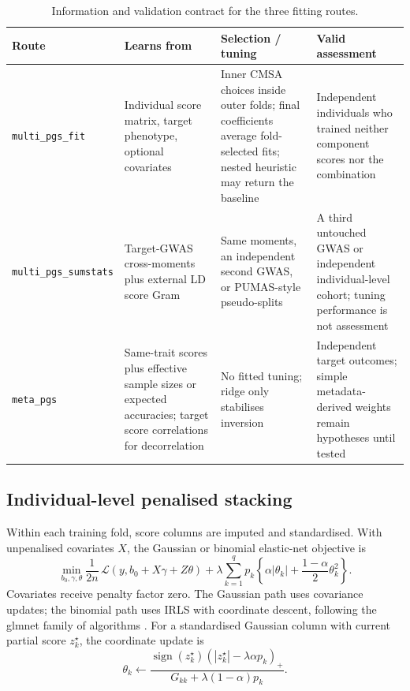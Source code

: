 \documentclass[10pt,a4paper]{article}
\newcommand{\code}[1]{\texttt{#1}}
\begin{document}
\begin{table}[H]
\centering
\caption{Information and validation contract for the three fitting routes.}
\label{tab:method-contract}
\scriptsize
\begin{tabularx}{\linewidth}{@{}L{26mm}Y Y Y@{}}
\toprule
\textbf{Route} & \textbf{Learns from} & \textbf{Selection / tuning} &
\textbf{Valid assessment} \\
\midrule
\code{multi\_pgs\_fit} & Individual score matrix, target phenotype, optional
covariates & Inner CMSA choices inside outer folds; final coefficients average
fold-selected fits; nested heuristic may return the baseline &
Independent individuals who trained neither component scores nor the
combination \\
\code{multi\_pgs\_sumstats} & Target-GWAS cross-moments plus external LD
score Gram & Same moments, an independent second GWAS, or PUMAS-style
pseudo-splits & A third untouched GWAS or independent individual-level cohort;
tuning performance is not assessment \\
\code{meta\_pgs} & Same-trait scores plus effective sample sizes or expected
accuracies; target score correlations for decorrelation & No fitted tuning;
ridge only stabilises inversion & Independent target outcomes; simple
metadata-derived weights remain hypotheses until tested \\
\bottomrule
\end{tabularx}
\end{table}

\subsection{Individual-level penalised stacking}

Within each training fold, score columns are imputed and standardised. With
unpenalised covariates \(X\), the Gaussian or binomial elastic-net objective is
\begin{equation}
  \min_{b_0,\gamma,\theta}
  \frac{1}{2n}\,
  \mathcal L\!\left(y,b_0+X\gamma+Z\theta\right)
  +\lambda\sum_{k=1}^{q}p_k
  \left\{\alpha|\theta_k|
  +\frac{1-\alpha}{2}\theta_k^2\right\}.
  \label{eq:individual-objective}
\end{equation}
Covariates receive penalty factor zero. The Gaussian path uses covariance
updates; the binomial path uses IRLS with coordinate descent, following the
glmnet family of algorithms \cite{friedman2010}. For a standardised Gaussian
column with current partial score \(z_k^\star\), the coordinate update is
\begin{equation}
  \theta_k \leftarrow
  \frac{\operatorname{sign}(z_k^\star)
        (|z_k^\star|-\lambda\alpha p_k)_+}
       {G_{kk}+\lambda(1-\alpha)p_k}.
  \label{eq:coordinate-update}
\end{equation}
\end{document}
